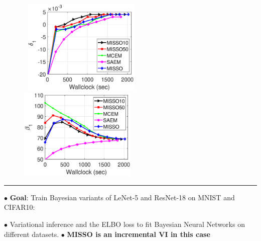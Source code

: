 \documentclass[final]{beamer}
\begin{document}
\begin{columns}[t]
\begin{column}{.225\linewidth}
\begin{tcolorbox}[colback=white!5!white,colframe=white,coltitle=yellow!50!black,fonttitle=\sffamily\bfseries\large,title=\center Logistic Regression on Hemorrhage dataset]
\begin{figure}[H]
\centering
    \mbox{
        \includegraphics[width=0.5\textwidth]{fig/logisticdelta.eps}
        \includegraphics[width=0.5\textwidth]{fig/logisticbeta.eps}
    }
\end{figure} 


 
\end{tcolorbox}


\begin{tcolorbox}[colback=white!5!white,colframe=white,coltitle=yellow!50!black,fonttitle=\sffamily\bfseries\large,title=\center Bayesian Neural Networks using MISSO]
{\color{yellow!50!black} \noindent\rule[0.5ex]{\linewidth}{4pt}}

$\bullet$  \textbf{Goal}: Train Bayesian variants of LeNet-5 and ResNet-18 on MNIST and CIFAR10:

$\bullet$ Variational inference and the ELBO loss to fit Bayesian Neural Networks on different datasets.
$\bullet$ \textbf{MISSO is an incremental VI in this case}


\end{tcolorbox}
\end{column}
\end{columns}
\end{document}
